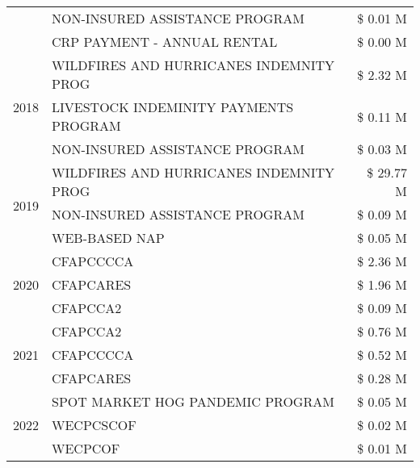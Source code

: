 \begin{tabular}{llr}
 & NON-INSURED ASSISTANCE PROGRAM & \$ 0.01 M \\
 & CRP PAYMENT - ANNUAL RENTAL & \$ 0.00 M \\
\cline{1-3}
\multirow[t]{3}{*}{2018} & WILDFIRES AND HURRICANES INDEMNITY PROG & \$ 2.32 M \\
 & LIVESTOCK INDEMINITY PAYMENTS PROGRAM & \$ 0.11 M \\
 & NON-INSURED ASSISTANCE PROGRAM & \$ 0.03 M \\
\cline{1-3}
\multirow[t]{3}{*}{2019} & WILDFIRES AND HURRICANES INDEMNITY PROG & \$ 29.77 M \\
 & NON-INSURED ASSISTANCE PROGRAM & \$ 0.09 M \\
 & WEB-BASED NAP & \$ 0.05 M \\
\cline{1-3}
\multirow[t]{3}{*}{2020} & CFAPCCCCA & \$ 2.36 M \\
 & CFAPCARES & \$ 1.96 M \\
 & CFAPCCA2 & \$ 0.09 M \\
\cline{1-3}
\multirow[t]{3}{*}{2021} & CFAPCCA2 & \$ 0.76 M \\
 & CFAPCCCCA & \$ 0.52 M \\
 & CFAPCARES & \$ 0.28 M \\
\cline{1-3}
\multirow[t]{3}{*}{2022} & SPOT MARKET HOG PANDEMIC PROGRAM & \$ 0.05 M \\
 & WECPCSCOF & \$ 0.02 M \\
 & WECPCOF & \$ 0.01 M \\
\cline{1-3}
\bottomrule
\end{tabular}
